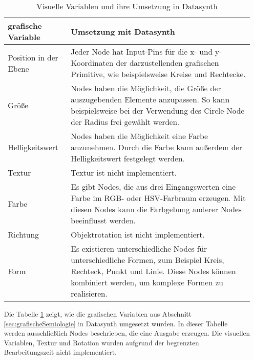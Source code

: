 \documentclass[a4paper, 
               12pt,
               DIV=calc,
               version=first,
               pdftex,
               headsepline,
               footsepline,
               bibliography=totocnumbered,
               listof=numbered]{scrreprt}
\begin{document}
\begin{table}
\centering
\begin{tabular}{|l|p{9cm}|}
\hline
\textbf{grafische Variable} & \textbf{Umsetzung mit Datasynth}\\
\hline
Position in der Ebene & Jeder Node hat Input-Pins für die x- und y-Koordinaten der darzustellenden grafischen Primitive, wie
beispielsweise Kreise und Rechtecke.\\
\hline
Größe & Nodes haben die Möglichkeit, die Größe der auszugebenden Elemente anzupassen.
So kann beispielsweise bei der Verwendung des Circle-Node der Radius frei gewählt werden.\\
\hline
Helligkeitswert & Nodes haben die Möglichkeit eine Farbe anzunehmen. Durch die Farbe kann
außerdem der Helligkeitswert festgelegt werden.\\
\hline
Textur & Textur ist nicht implementiert.\\
\hline
Farbe & Es gibt Nodes, die aus drei Eingangswerten eine Farbe im RGB- oder HSV-Farbraum erzeugen. Mit diesen Nodes kann die Farbgebung
anderer Nodes beeinflusst werden.\\
\hline
Richtung & Objektrotation ist nicht implementiert.\\
\hline
Form & Es existieren unterschiedliche Nodes für unterschiedliche Formen, zum Beispiel Kreis, Rechteck, Punkt und Linie. Diese Nodes
können kombiniert werden, um komplexe Formen zu realisieren.\\
\hline
\end{tabular}
\caption{Visuelle Variablen und ihre Umsetzung in Datasynth}
\label{tab:vars}
\end{table}
Die Tabelle \ref{tab:vars} zeigt, wie die grafischen Variablen aus Abschnitt
\ref{sec:grafischeSemiologie} in Datasynth umgesetzt wurden. In dieser Tabelle werden ausschließlich
Nodes beschrieben, die eine Ausgabe erzeugen. Die visuellen Variablen, Textur und Rotation
wurden aufgrund der begrenzten Bearbeitungszeit nicht implementiert.
\end{document}
